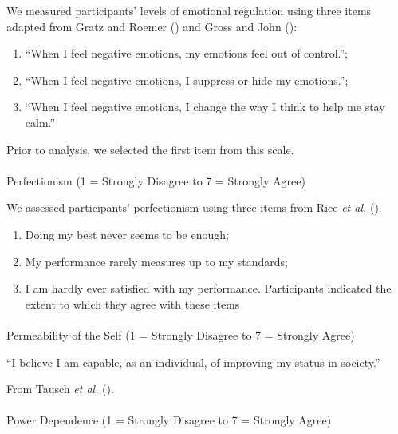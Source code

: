 \documentclass[
  single column]{article}
\makeatletter
\let\oldparagraph\paragraph
\renewcommand{\paragraph}{
    \@ifstar
      \xxxParagraphStar
      \xxxParagraphNoStar
  }
\newcommand{\xxxParagraphStar}[1]{\oldparagraph*{#1}\mbox{}}
\newcommand{\xxxParagraphNoStar}[1]{\oldparagraph{#1}\mbox{}}
\providecommand{\tightlist}{%
  \setlength{\itemsep}{0pt}\setlength{\parskip}{0pt}}\usepackage{longtable,booktabs,array}
\makeatother
\begin{document}
We measured participants' levels of emotional regulation using three
items adapted from Gratz and Roemer
() and Gross and John
():

\begin{enumerate}
\def\labelenumi{(\arabic{enumi})}
\tightlist
\item
  ``When I feel negative emotions, my emotions feel out of control.'';
\item
  ``When I feel negative emotions, I suppress or hide my emotions.'';
\item
  ``When I feel negative emotions, I change the way I think to help me
  stay calm.''
\end{enumerate}

Prior to analysis, we selected the first item from this scale.

\paragraph{Perfectionism (1 = Strongly Disagree to 7 = Strongly
Agree)}\label{perfectionism-1-strongly-disagree-to-7-strongly-agree}

We assessed participants' perfectionism using three items from Rice
\emph{et al.} ().

\begin{enumerate}
\def\labelenumi{(\arabic{enumi})}
\tightlist
\item
  Doing my best never seems to be enough;
\item
  My performance rarely measures up to my standards;
\item
  I am hardly ever satisfied with my performance. Participants indicated
  the extent to which they agree with these items
\end{enumerate}

\paragraph{Permeability of the Self (1 = Strongly Disagree to 7 =
Strongly
Agree)}\label{permeability-of-the-self-1-strongly-disagree-to-7-strongly-agree}

``I believe I am capable, as an individual, of improving my status in
society.''

From Tausch \emph{et al.} ().

\paragraph{Power Dependence (1 = Strongly Disagree to 7 = Strongly
Agree)}\label{power-dependence-1-strongly-disagree-to-7-strongly-agree}
\end{document}

